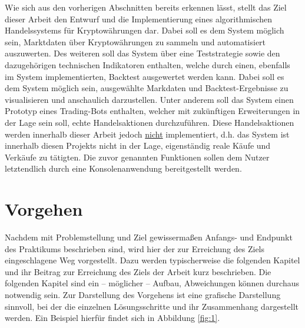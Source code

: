 \documentclass[oneside]{ausarbeitung}
\begin{document}
Wie sich aus den vorherigen Abschnitten bereits erkennen lässt,
stellt das Ziel dieser Arbeit den Entwurf und die Implementierung
eines algorithmischen Handelssystems für Kryptowährungen dar. Dabei
soll es dem System möglich sein, Marktdaten über Kryptowährungen zu
sammeln und automatisiert auszuwerten. Des weiteren soll das System
über eine Teststrategie sowie den dazugehörigen technischen
Indikatoren enthalten, welche durch einen, ebenfalls im System
implementierten, Backtest ausgewertet werden kann. Dabei soll es dem
System möglich sein, ausgewählte Markdaten und Backtest-Ergebnisse
zu visualisieren und anschaulich darzustellen. Unter anderem soll das
System einen Prototyp eines Trading-Bots enthalten, welcher mit
zukünftigen Erweiterungen in der Lage sein soll, echte
Handelsaktionen durchzuführen. Diese Handelsaktionen werden innerhalb
dieser Arbeit jedoch \underline{nicht} implementiert, d.h. das System
ist innerhalb diesen Projekts nicht in der Lage, eigenständig reale
Käufe und Verkäufe zu tätigten. Die zuvor genannten Funktionen
sollen dem Nutzer letztendlich durch eine Konsolenanwendung
bereitgestellt werden.

\section{Vorgehen}
\label{sec:vorgehen}

Nachdem mit Problemstellung und Ziel gewissermaßen Anfangs- und Endpunkt 
des Praktikums beschrieben sind, wird hier der zur Erreichung des Ziels 
eingeschlagene Weg vorgestellt. Dazu werden typischerweise die folgenden 
Kapitel und ihr Beitrag zur Erreichung des Ziels der Arbeit kurz 
beschrieben. Die folgenden Kapitel sind ein – möglicher – Aufbau, 
Abweichungen können durchaus notwendig sein. Zur Darstellung des 
Vorgehens ist eine grafische Darstellung sinnvoll, bei der die einzelnen 
Lösungsschritte und ihr Zusammenhang dargestellt werden. Ein Beispiel 
hierfür findet sich in Abbildung \ref{fig:1}.
\end{document}

